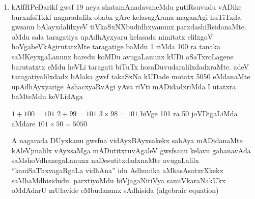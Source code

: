 \begin{enumerate}[\rm 1]
\item kAlfRPeDarikf gwsf {\rm 19} neya shatamAnadavaneMdu gutiRsuvudu vADike burxnfsiTxkf nagaradalilx obabx gAre kelasagArana maganAgi huTiTxda gwsanu bAlayxdalilxyeV tiVkaSxNXbudidhxyanunx parxdashiRsidanaMte. oMdu sala taragatiya upAdhAyxyaru kelasada nimitatx elilxgoV hoVgabeVkAgirutatxMte taragatige baMdu {\rm 1} riMda {\rm 100} ra tanaka saMKeyxgaLanunx baredu koMDu avugaLanunx kUDi aSaTxroLagene barutatxtx eMdu heVLi taragati biTuTx horaDuvudaralilxdadxraMte. adeV taragatiyalilxdadx bAlaka gwsf takaSxNa kUDade motatx {\rm 5050} eMdanaMte upAdhAyxyarige AshacxyaRvAgi yAva riVti mADidadxriMda I utatxra baMteMdu keVLidAga

$1+100=101$ \quad $2+99=101$ \quad $3\times 98=101$ \quad hiVge {\rm 101} ra {\rm 50} joVDigaLiMda aMdare \quad $101\times 50=5050$

A nagarada DUyxkanu gwsfna vidAyxBAyxsakekx sahAya mADidanaMte kAleVjinalilx vAyxsaMga mADutitxruvAgaleV gwsfsanu kelavu gahanavAda saMshoVdhanegaLanunx naDesutitxdadxnaMte avugaLalilx ``kaniSaThxvagaRgaLa vidhAna'' idu Adhunika aMkasAsatxrXkekx saMbaMdhisidudu. parxtiyoMdu biVjagaNitiVya samiVkaraNakUkx oMdAdarU mUlavide eMbudanunx sAdhisida {\rm (algebraic equation)}  


\end{enumerate}
